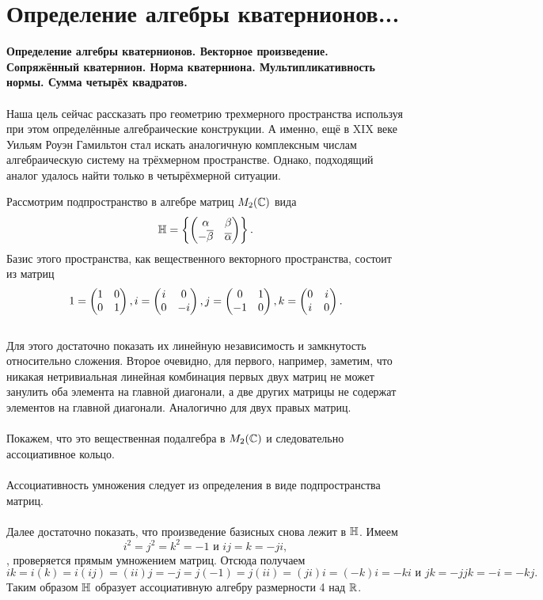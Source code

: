 \section{
		Определение алгебры кватернионов... %
	}

\textbf{ Определение алгебры кватернионов. Векторное произведение. Сопряжённый кватернион. Норма кватерниона. Мультипликативность нормы. Сумма четырёх квадратов.}\\
\\
Наша цель сейчас рассказать про геометрию трехмерного пространства используя при этом определённые алгебраические конструкции. А именно, ещё в XIX веке Уильям Роуэн Гамильтон стал искать аналогичную комплексным числам алгебраическую систему на трёхмерном пространстве.  
Однако, подходящий аналог удалось найти только в четырёхмерной ситуации.

Рассмотрим подпространство в алгебре матриц $M_2(\mathbb{C})$ вида
$$\mathbb{H} = \left\{\begin{pmatrix} \alpha & \beta \\ -\overline{\beta} & \overline{\alpha} \end{pmatrix} \right\}.$$
Базис этого пространства, как вещественного векторного пространства, состоит из матриц 
$$ 1=\begin{pmatrix} 1 & 0 \\ 0& 1 \end{pmatrix}, i= \begin{pmatrix} i & 0 \\ 0& -i \end{pmatrix}, j=\begin{pmatrix} 0& 1 \\ -1 & 0 \end{pmatrix}, k=\begin{pmatrix} 0 & i \\ i & 0\end{pmatrix}. $$ 
\\
Для этого достаточно показать их линейную независимость и замкнутость относительно сложения. Второе очевидно, для первого, например, заметим, что никакая нетривиальная линейная комбинация первых двух матриц не может занулить оба элемента на главной диагонали, а две других матрицы не содержат элементов на главной диагонали. Аналогично для двух правых матриц.\\ 
\\ 
Покажем, что это вещественная подалгебра в $M_2(\mathbb{C})$ и следовательно ассоциативное кольцо. \\
\\
Ассоциативность умножения следует из определения в виде подпространства матриц.\\
\\
Далее достаточно показать, что произведение базисных снова лежит в $\mathbb{H}$. Имеем $$i^2=j^2=k^2=-1 \text{ и } ij=k=-ji,$$, проверяется прямым умножением матриц. Отсюда получаем $$ik = i(k)= i(ij)=(ii)j = -j = j (-1) = j(ii) = (ji)i =(-k)i =-ki \text{ и } jk=-jjk=-i=-kj.$$ Таким образом $\mathbb{H}$ образует ассоциативную алгебру размерности 4 над $\mathbb{R}$.

